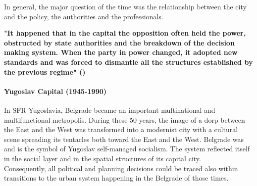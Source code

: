\documentclass[11pt]{report}
\begin{document}
In general, the major question of the time was the relationship between the city and the policy, the authorities and the professionals.

\textbf{"It happened that in the capital the opposition often held the power, obstructed by state authorities and the breakdown of the decision making system. When the party in power changed, it adopted new standards and was forced to dismantle all the structures established by the previous regime" (\href{Dubravka}{\citealt{stojanovic_kontroverze_2015}})}

\paragraph{Yugoslav Capital (1945-1990)}

In SFR Yugoslavia, Belgrade became an important multinational and multifunctional metropolis. During these 50 years, the image of a dorp between the East and the West was transformed into a modernist city with a cultural scene spreading its tentacles both toward the East and the West. Belgrade was and is the symbol of Yugoslav self-managed socialism. The system reflected itself in the social layer and in the spatial structures of its capital city.
\\

Consequently, all political and planning decisions could be traced also within transitions to the urban system happening in the Belgrade of those times.
\end{document}
